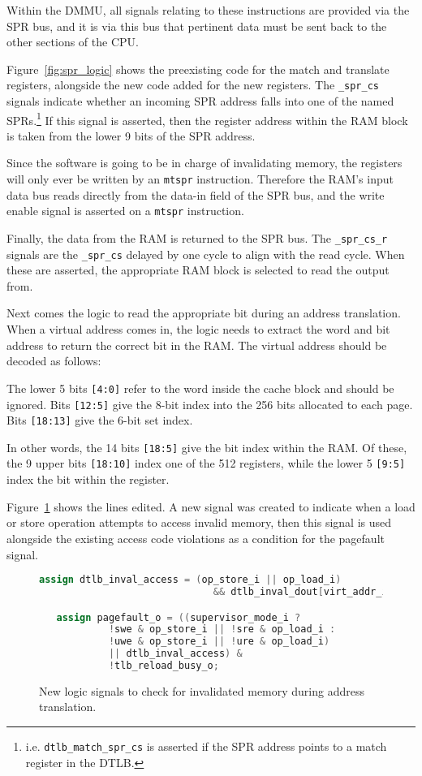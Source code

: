 Within the DMMU, all signals relating to these instructions are provided via the SPR bus, and it is via this bus that pertinent data must be sent back to the other sections of the CPU.

Figure~\ref{fig:spr_logic} shows the preexisting code for the match and translate registers, alongside the new code added for the new registers. The \verb|_spr_cs| signals indicate whether an incoming SPR address falls into one of the named SPRs.\footnote{i.e. \texttt{dtlb\_match\_spr\_cs} is asserted if the SPR address points to a match register in the DTLB.} If this signal is asserted, then the register address within the RAM block is taken from the lower 9 bits of the SPR address.

Since the software is going to be in charge of invalidating memory, the registers will only ever be written by an \texttt{mtspr} instruction. Therefore the RAM's input data bus reads directly from the data-in field of the SPR bus, and the write enable signal is asserted on a \texttt{mtspr} instruction.

Finally, the data from the RAM is returned to the SPR bus. The \verb|_spr_cs_r| signals are the \verb|_spr_cs| delayed by one cycle to align with the read cycle. When these are asserted, the appropriate RAM block is selected to read the output from.

Next comes the logic to read the appropriate bit during an address translation. When a virtual address comes in, the logic needs to extract the word and bit address to return the correct bit in the RAM. The virtual address should be decoded as follows:

The lower 5 bits \texttt{[4:0]} refer to the word inside the cache block and should be ignored. Bits \texttt{[12:5]} give the 8-bit index into the 256 bits allocated to each page. Bits \texttt{[18:13]} give the 6-bit set index.

In other words, the 14 bits \texttt{[18:5]} give the bit index within the RAM. Of these, the 9 upper bits \texttt{[18:10]} index one of the 512 registers, while the lower 5 \texttt{[9:5]} index the bit within the register.

Figure~\ref{fig:pgf_logic} shows the lines edited. A new signal was created to indicate when a load or store operation attempts to access invalid memory, then this signal is used alongside the existing access code violations as a condition for the pagefault signal.

\begin{figure}[t]
  \centering
  \begin{lstlisting}[language=Verilog]
   assign dtlb_inval_access = (op_store_i || op_load_i)
                              && dtlb_inval_dout[virt_addr_i[9:5]];

   assign pagefault_o = ((supervisor_mode_i ?
			!swe & op_store_i || !sre & op_load_i :
			!uwe & op_store_i || !ure & op_load_i)
			|| dtlb_inval_access) &
			!tlb_reload_busy_o;
  \end{lstlisting}
  \caption{New logic signals to check for invalidated memory during address translation.}
  \label{fig:pgf_logic}
\end{figure}

